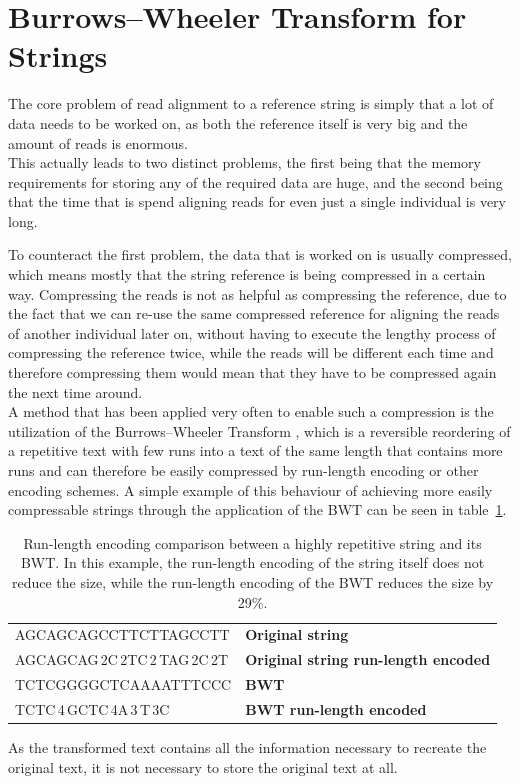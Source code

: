 \documentclass[a4paper,12pt,twoside,BCOR=10mm]{scrbook}
\begin{document}
\section{Burrows--Wheeler Transform for Strings}

The core problem of read alignment to a reference string is simply that a
lot of data needs to be worked on, as both the reference itself is very big
and the amount of reads is enormous. \\
This actually leads to two distinct problems, the first being that the
memory requirements for storing any of the required data are huge,
and the second being that the time that is spend aligning reads for
even just a single individual is very long.

To counteract the first problem, the data that is worked on is usually compressed,
which means mostly that the string reference is being compressed in a certain way.
Compressing the reads is not as helpful as compressing the reference,
due to the fact that we can re-use the same compressed reference for aligning the
reads of another individual later on, without having to execute the lengthy
process of compressing the reference twice, while the reads will be different
each time and therefore compressing them would mean that they have to be compressed again the next time around. \\
A method that has been applied very often to enable such a compression is the utilization of the
Burrows--Wheeler Transform \citep{Burrows1994}, which
is a reversible reordering of a
repetitive text with few runs into a text of the same length that contains more runs
and can therefore be easily compressed by run-length encoding or other encoding schemes.
A simple example of this behaviour of achieving more easily compressable strings through the application of the BWT
can be seen in table~\ref{table:evo_background_bwt_run_enc}.
\begin{table}[htb]
\centering
\caption[Run-length encoding comparison between a repetitive string and its BWT]{Run-length encoding comparison between a highly repetitive string and its BWT. In this example, the run-length encoding of the string itself does not reduce the size, while the run-length encoding of the BWT reduces the size by 29\%.}
   \begin{tabularx}{\textwidth}{ | X | X | }
   \hline
   AGCAGCAGCCTTCTTAGCCTT & \textbf{Original string} \\
   AGCAGCAG\,2C\,2TC\,2\,TAG\,2C\,2T & \textbf{Original string run-length encoded} \\
   \hline
   TCTCGGGGCTCAAAATTTCCC & \textbf{BWT} \\
   TCTC\,4\,GCTC\,4A\,3\,T\,3C & \textbf{BWT run-length encoded} \\
   \hline
   \end{tabularx}
\label{table:evo_background_bwt_run_enc}
\end{table}
As the transformed text contains all the information necessary to recreate the
original text, it is not necessary to store the original text at all.
\end{document}
